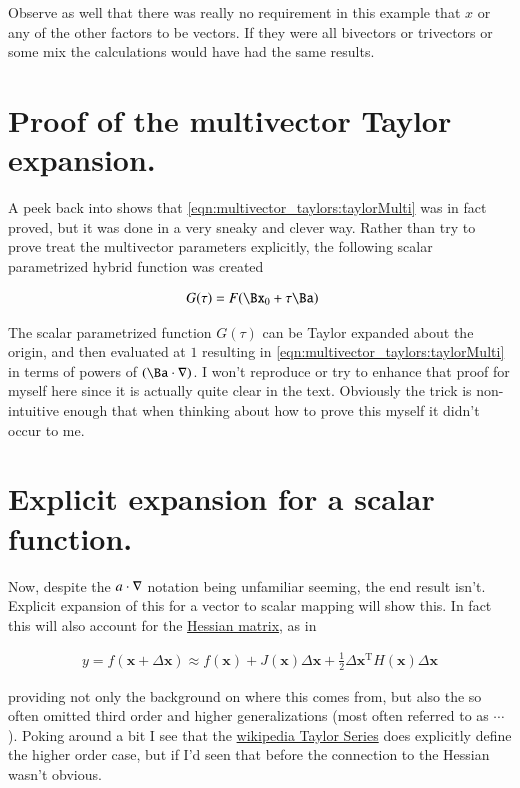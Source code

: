 Observe as well that there was really no requirement in this example that $x$ or any of the other factors to be vectors.  If they were all bivectors or trivectors or some mix the calculations would have had the same results.

\section{Proof of the multivector Taylor expansion. }

A peek back into \cite{hestenes1999nfc} shows that 
\ref{eqn:multivector_taylors:taylorMulti} was in fact proved, but it was done in a very
sneaky and clever way.  Rather than try to prove treat the multivector
parameters explicitly, the following scalar parametrized hybrid function
was created

\begin{align}
G(\tau) &= F(\Bx_0 + \tau\Ba)
\end{align}

The scalar parametrized function $G(\tau)$ can be Taylor expanded about
the origin, and then evaluated at $1$ resulting in 
\ref{eqn:multivector_taylors:taylorMulti} in terms of powers of $(\Ba \cdot \grad)$.  
I won't reproduce or try to
enhance that proof for myself here since it is actually 
quite clear in the text.  Obviously the trick is non-intuitive enough
that when thinking about how to prove this myself it didn't occur to me.

\section{Explicit expansion for a scalar function. }

Now, despite the $a \cdot \nabla$ notation being unfamiliar seeming, the 
end result isn't.  Explicit expansion of this for a vector to scalar mapping
will show this.  In fact this will also account for the 
\href{http://en.wikipedia.org/wiki/Hessian_matrix}{Hessian matrix}, as in

\begin{align*}
y=f(\mathbf{x}+\Delta\mathbf{x})\approx f(\mathbf{x}) + J(\mathbf{x})\Delta \mathbf{x} +\frac{1}{2} \Delta\mathbf{x}^\mathrm{T} H(\mathbf{x}) \Delta\mathbf{x}
\end{align*}

providing
not only the background on where this comes from, but also the so often
omitted third order and higher generalizations (most often referred to as $\cdots$).  Poking around a bit I see that the \href{http://en.wikipedia.org/wiki/Taylor_expansion}{wikipedia Taylor Series} does explicitly define the higher order case, but if 
I'd seen that before the connection to the Hessian wasn't obvious.


